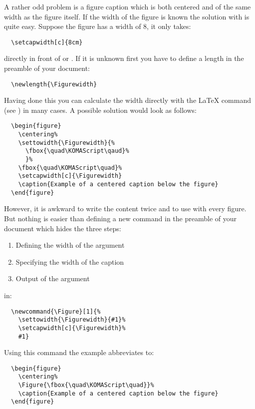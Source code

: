 \begin{Example}
  A rather odd problem is a figure caption which is both centered and
  of the same width as the figure itself. If the width of the figure
  is known the solution with \KOMAScript{} is quite easy. Suppose the
  figure has a width of 8, it only takes:
\begin{lstlisting}
  \setcapwidth[c]{8cm}
\end{lstlisting}
  directly in front of  or . If it
  is unknown first you have to define a length in the preamble of your
  document:
\begin{lstlisting}
  \newlength{\Figurewidth}
\end{lstlisting}
  Having done this you can calculate the width directly with the
  \LaTeX{} command  (see \cite{latex:usrguide})
 in many cases. A possible solution would look as follows:
\begin{lstlisting}
  \begin{figure}
    \centering%
    \settowidth{\Figurewidth}{%
      \fbox{\quad\KOMAScript\qaud}%
      }%
    \fbox{\quad\KOMAScript\quad}%
    \setcapwidth[c]{\Figurewidth}
    \caption{Example of a centered caption below the figure}
  \end{figure}
\end{lstlisting}
  However, it is awkward to write the content twice and to use
   with every figure. But nothing is easier than
  defining a new command in the preamble of your document which
  hides the three steps:
  \begin{enumerate}
  \item Defining the width of the argument
  \item Specifying the width of the caption
  \item Output of the argument
  \end{enumerate}
  in:
\begin{lstlisting}
  \newcommand{\Figure}[1]{%
    \settowidth{\Figurewidth}{#1}%
    \setcapwidth[c]{\Figurewidth}%
    #1}
\end{lstlisting}
  Using this command the example abbreviates to:
\begin{lstlisting}
  \begin{figure}
    \centering%
    \Figure{\fbox{\quad\KOMAScript\quad}}%
    \caption{Example of a centered caption below the figure}
  \end{figure}
\end{lstlisting}
  

\end{Example}
